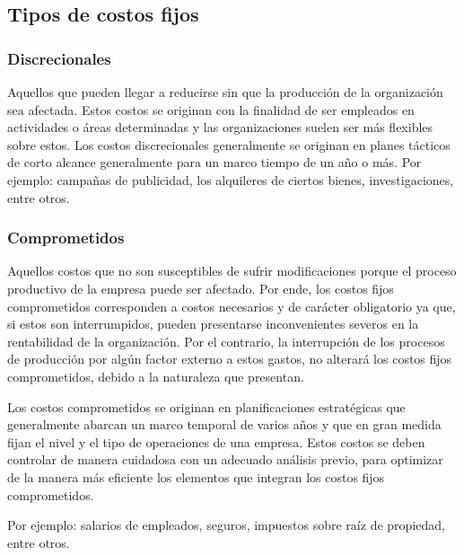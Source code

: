 \documentclass[../main]{subfiles}
\begin{document}
\subsection{Tipos de costos fijos}
\subsubsection{Discrecionales}
Aquellos que pueden llegar a reducirse sin que la producción de la
organización sea afectada. Estos costos se originan con la finalidad
de ser empleados en actividades o áreas determinadas y las
organizaciones suelen ser más flexibles sobre estos. Los costos
discrecionales generalmente se originan en planes tácticos de
corto alcance generalmente para un marco tiempo de un año o más.
Por ejemplo: campañas de publicidad, los alquileres de ciertos
bienes, investigaciones, entre otros.
\subsubsection{Comprometidos}
Aquellos costos que no son susceptibles de sufrir modificaciones
porque el proceso productivo de la empresa puede ser afectado. Por
ende, los costos fijos comprometidos corresponden a costos necesarios
y de carácter obligatorio ya que, si estos son interrumpidos, pueden
presentarse inconvenientes severos en la rentabilidad de la
organización. Por el contrario, la interrupción de los procesos de
producción por algún factor externo a estos gastos, no alterará los
costos fijos comprometidos, debido a la naturaleza que presentan.

Los costos comprometidos se originan en planificaciones estratégicas
que generalmente abarcan un marco temporal de varios años y que en
gran medida fijan el nivel y el tipo de operaciones de una empresa.
Estos costos se deben controlar de manera cuidadosa con un adecuado
análisis previo, para optimizar de la manera más eficiente los
elementos que integran los costos fijos comprometidos.

Por ejemplo: salarios de empleados, seguros, impuestos sobre raíz de
propiedad, entre otros.
\end{document}
